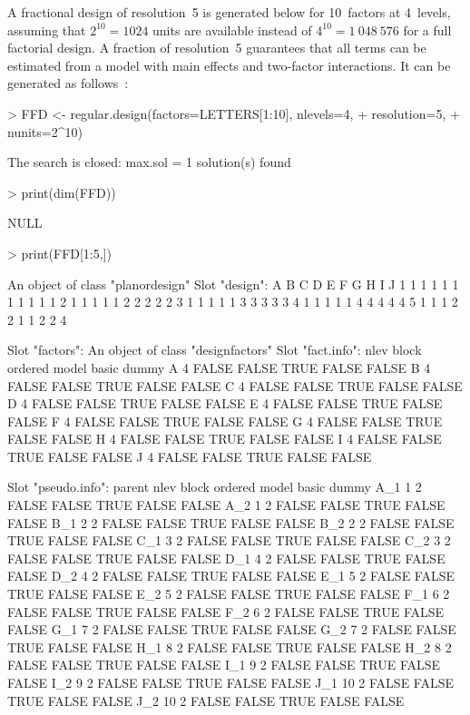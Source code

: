 \documentclass[a4paper]{article}
\begin{document}
A fractional design of resolution~5 is generated below for 10~factors
at 4~levels, assuming that $2^{10}=1024$ units are available instead
of $4^{10}=1~048~576$ for a full factorial design. A fraction of
resolution~5 guarantees that all terms can be estimated from a model
with main effects and two-factor interactions. It can be generated as
follows~:
\begin{Schunk}
\begin{Sinput}
> FFD <- regular.design(factors=LETTERS[1:10], nlevels=4, 
+                       resolution=5, 
+                       nunits=2^10)
\end{Sinput}
\begin{Soutput}
The search is closed: max.sol =  1 solution(s) found 
\end{Soutput}
\begin{Sinput}
> print(dim(FFD))
\end{Sinput}
\begin{Soutput}
NULL
\end{Soutput}
\begin{Sinput}
> print(FFD[1:5,])
\end{Sinput}
\begin{Soutput}
An object of class "planordesign"
Slot "design":
  A B C D E F G H I J
1 1 1 1 1 1 1 1 1 1 1
2 1 1 1 1 1 2 2 2 2 2
3 1 1 1 1 1 3 3 3 3 3
4 1 1 1 1 1 4 4 4 4 4
5 1 1 1 2 2 1 1 2 2 4

Slot "factors":
An object of class "designfactors"
Slot "fact.info":
  nlev block ordered model basic dummy
A    4 FALSE   FALSE  TRUE FALSE FALSE
B    4 FALSE   FALSE  TRUE FALSE FALSE
C    4 FALSE   FALSE  TRUE FALSE FALSE
D    4 FALSE   FALSE  TRUE FALSE FALSE
E    4 FALSE   FALSE  TRUE FALSE FALSE
F    4 FALSE   FALSE  TRUE FALSE FALSE
G    4 FALSE   FALSE  TRUE FALSE FALSE
H    4 FALSE   FALSE  TRUE FALSE FALSE
I    4 FALSE   FALSE  TRUE FALSE FALSE
J    4 FALSE   FALSE  TRUE FALSE FALSE

Slot "pseudo.info":
    parent nlev block ordered model basic dummy
A_1      1    2 FALSE   FALSE  TRUE FALSE FALSE
A_2      1    2 FALSE   FALSE  TRUE FALSE FALSE
B_1      2    2 FALSE   FALSE  TRUE FALSE FALSE
B_2      2    2 FALSE   FALSE  TRUE FALSE FALSE
C_1      3    2 FALSE   FALSE  TRUE FALSE FALSE
C_2      3    2 FALSE   FALSE  TRUE FALSE FALSE
D_1      4    2 FALSE   FALSE  TRUE FALSE FALSE
D_2      4    2 FALSE   FALSE  TRUE FALSE FALSE
E_1      5    2 FALSE   FALSE  TRUE FALSE FALSE
E_2      5    2 FALSE   FALSE  TRUE FALSE FALSE
F_1      6    2 FALSE   FALSE  TRUE FALSE FALSE
F_2      6    2 FALSE   FALSE  TRUE FALSE FALSE
G_1      7    2 FALSE   FALSE  TRUE FALSE FALSE
G_2      7    2 FALSE   FALSE  TRUE FALSE FALSE
H_1      8    2 FALSE   FALSE  TRUE FALSE FALSE
H_2      8    2 FALSE   FALSE  TRUE FALSE FALSE
I_1      9    2 FALSE   FALSE  TRUE FALSE FALSE
I_2      9    2 FALSE   FALSE  TRUE FALSE FALSE
J_1     10    2 FALSE   FALSE  TRUE FALSE FALSE
J_2     10    2 FALSE   FALSE  TRUE FALSE FALSE


\end{Soutput}
\end{Schunk}
\end{document}
